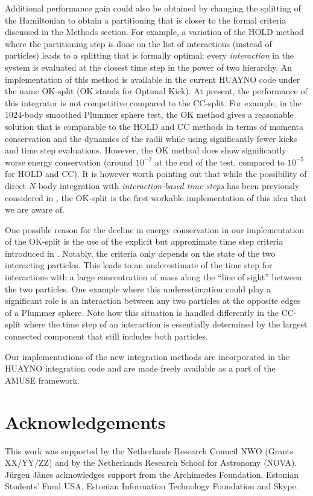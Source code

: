 \documentclass[referee]{aa}
\begin{document}
Additional performance gain could also be obtained by changing the
splitting of the Hamiltonian to obtain a partitioning that is closer
to the formal criteria discussed in the Methods section. For example,
a variation of the HOLD method where the partitioning step is done
on the list of interactions (instead of particles) leads to a splitting
that is formally optimal: every \emph{interaction} in the system is
evaluated at the closest time step in the power of two hierarchy.
An implementation of this method is available in the current HUAYNO
code under the name OK-split (OK stands for Optimal Kick). At present,
the performance of this integrator is not competitive compared to
the CC-split. For example, in the $1024$-body smoothed Plummer sphere
test, the OK method gives a reasonable solution that is comparable
to the HOLD and CC methods in terms of momenta conservation and the
dynamics of the radii while using significantly fewer kicks and time
step evaluations. However, the OK method does show significantly worse
energy conservation (around $10^{-2}$ at the end of the test, compared
to $10^{-5}$ for HOLD and CC). It is however worth pointing out that
while the possibility of direct $N$-body integration with \emph{interaction-based
time steps} has been previously considered in \cite[sec 4.2]{Nitadori:2008gt},
the OK-split is the first workable implementation of this idea that
we are aware of.

One possible reason for the decline in energy conservation in our
implementation of the OK-split is the use of the explicit but approximate
time step criteria introduced in \cite{Pelupessy:2012if}. Notably,
the criteria only depends on the state of the two interacting particles.
This leads to an underestimate of the time step for interactions with
a large concentration of mass along the ``line of sight'' between
the two particles. One example where this underestimation could play
a significant role is an interaction between any two particles at
the opposite edges of a Plummer sphere. Note how this situation is
handled differently in the CC-split where the time step of an interaction
is essentially determined by the largest connected component that
still includes both particles.

Our implementations of the new integration methods are incorporated
in the HUAYNO integration code and are made freely available as a
part of the AMUSE framework. 


\section{Acknowledgements}

This work was supported by the Netherlands Research Council NWO (Grants
XX/YY/ZZ) and by the Netherlands Research School for Astronomy (NOVA).
J\"urgen J\"anes acknowledges support from the Archimedes
Foundation, Estonian Students' Fund USA, Estonian Information Technology
Foundation and Skype.



\end{document}
